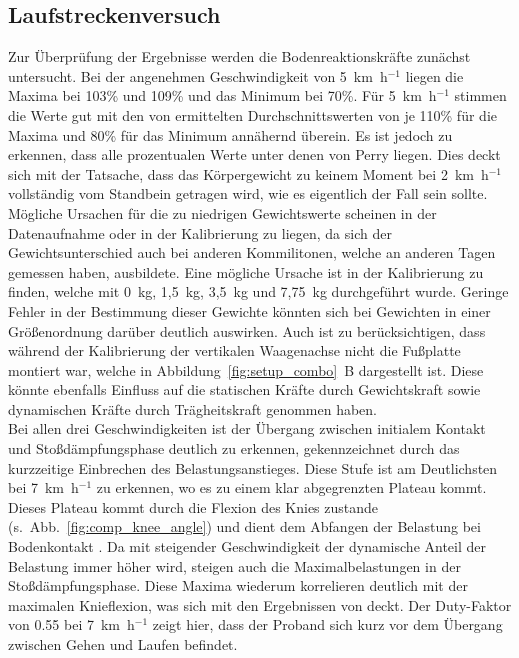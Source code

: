 \subsection{Laufstreckenversuch}
Zur Überprüfung der Ergebnisse werden die Bodenreaktionskräfte zunächst untersucht. Bei der angenehmen Geschwindigkeit von 5~km~h$^{-1}$ liegen die Maxima bei 103\% und 109\% und das Minimum bei 70\%. Für 5~km~h$^{-1}$ stimmen die Werte gut mit den von \textcite{perry2010gait} ermittelten Durchschnittswerten von je 110\% für die Maxima und 80\% für das Minimum annähernd überein. Es ist jedoch zu erkennen, dass alle prozentualen Werte unter denen von Perry liegen. Dies deckt sich mit der Tatsache, dass das Körpergewicht zu keinem Moment bei 2~km~h$^{-1}$ vollständig vom Standbein getragen wird, wie es eigentlich der Fall sein sollte. Mögliche Ursachen für die zu niedrigen Gewichtswerte scheinen in der Datenaufnahme oder in der Kalibrierung zu liegen, da sich der Gewichtsunterschied auch bei anderen Kommilitonen, welche an anderen Tagen gemessen haben, ausbildete. Eine mögliche Ursache ist in der Kalibrierung zu finden, welche mit 0~kg, 1,5~kg, 3,5~kg und 7,75~kg durchgeführt wurde. Geringe Fehler in der Bestimmung dieser Gewichte könnten sich bei Gewichten in einer Größenordnung darüber deutlich auswirken. Auch ist zu berücksichtigen, dass während der Kalibrierung der vertikalen Waagenachse nicht die Fußplatte montiert war, welche in Abbildung~\ref{fig:setup_combo}~B dargestellt ist. Diese könnte ebenfalls Einfluss auf die statischen Kräfte durch Gewichtskraft sowie dynamischen Kräfte durch Trägheitskraft genommen haben.\\
Bei allen drei Geschwindigkeiten ist der Übergang zwischen initialem Kontakt und Stoßdämpfungsphase deutlich zu erkennen, gekennzeichnet durch das kurzzeitige Einbrechen des Belastungsanstieges. Diese Stufe ist am Deutlichsten bei 7~km~h$^{-1}$ zu erkennen, wo es zu einem klar abgegrenzten Plateau kommt. Dieses Plateau kommt durch die Flexion des Knies zustande (s.~Abb.~\ref{fig:comp_knee_angle}) und dient dem Abfangen der Belastung bei Bodenkontakt \parencite{perry2010gait}. Da mit steigender Geschwindigkeit der dynamische Anteil der Belastung immer höher wird, steigen auch die Maximalbelastungen in der Stoßdämpfungsphase. Diese Maxima wiederum korrelieren deutlich mit der maximalen Knieflexion, was sich mit den Ergebnissen von \textcite{kirtley1985influence} deckt. Der Duty-Faktor von 0.55 bei 7~km~h$^{-1}$ zeigt hier, dass der Proband sich kurz vor dem Übergang zwischen Gehen und Laufen befindet.\\

